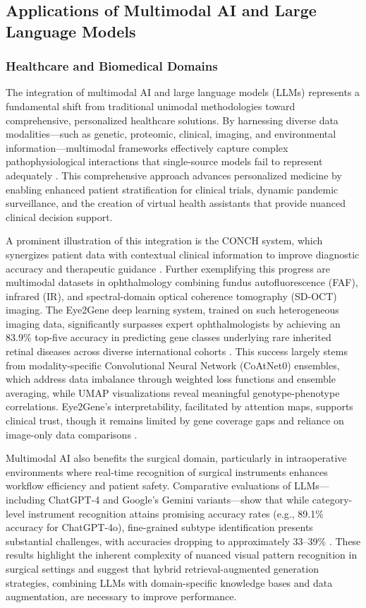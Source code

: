 \subsection{Applications of Multimodal AI and Large Language Models}

\subsubsection{Healthcare and Biomedical Domains}

The integration of multimodal AI and large language models (LLMs) represents a fundamental shift from traditional unimodal methodologies toward comprehensive, personalized healthcare solutions. By harnessing diverse data modalities—such as genetic, proteomic, clinical, imaging, and environmental information—multimodal frameworks effectively capture complex pathophysiological interactions that single-source models fail to represent adequately \cite{ref12}. This comprehensive approach advances personalized medicine by enabling enhanced patient stratification for clinical trials, dynamic pandemic surveillance, and the creation of virtual health assistants that provide nuanced clinical decision support.

A prominent illustration of this integration is the CONCH system, which synergizes patient data with contextual clinical information to improve diagnostic accuracy and therapeutic guidance \cite{ref12}. Further exemplifying this progress are multimodal datasets in ophthalmology combining fundus autofluorescence (FAF), infrared (IR), and spectral-domain optical coherence tomography (SD-OCT) imaging. The Eye2Gene deep learning system, trained on such heterogeneous imaging data, significantly surpasses expert ophthalmologists by achieving an 83.9\% top-five accuracy in predicting gene classes underlying rare inherited retinal diseases across diverse international cohorts \cite{ref10}. This success largely stems from modality-specific Convolutional Neural Network (CoAtNet0) ensembles, which address data imbalance through weighted loss functions and ensemble averaging, while UMAP visualizations reveal meaningful genotype-phenotype correlations. Eye2Gene’s interpretability, facilitated by attention maps, supports clinical trust, though it remains limited by gene coverage gaps and reliance on image-only data comparisons \cite{ref10}.

Multimodal AI also benefits the surgical domain, particularly in intraoperative environments where real-time recognition of surgical instruments enhances workflow efficiency and patient safety. Comparative evaluations of LLMs—including ChatGPT-4 and Google's Gemini variants—show that while category-level instrument recognition attains promising accuracy rates (e.g., 89.1\% accuracy for ChatGPT-4o), fine-grained subtype identification presents substantial challenges, with accuracies dropping to approximately 33–39\% \cite{ref26}. These results highlight the inherent complexity of nuanced visual pattern recognition in surgical settings and suggest that hybrid retrieval-augmented generation strategies, combining LLMs with domain-specific knowledge bases and data augmentation, are necessary to improve performance.

